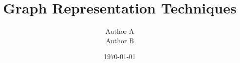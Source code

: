 \documentclass[12pt]{beamer}
\title[About Beamer]{Graph Representation Techniques}
\author[Author A and Author B]{Author A\\ Author B }
\date{\today}
\begin{document}
\begin{frame}
\titlepage
\end{frame}
\end{document}
